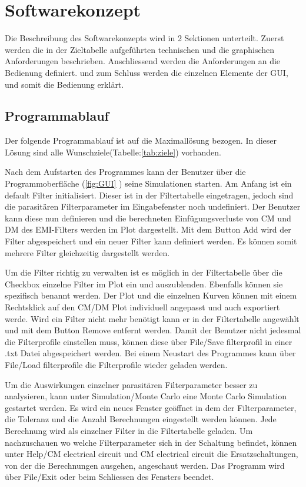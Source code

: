 \section{Softwarekonzept} \label{sec:softwarekonzept}

Die Beschreibung des Softwarekonzepts wird in 2 Sektionen unterteilt. Zuerst werden die in der Zieltabelle aufgeführten technischen und die graphischen Anforderungen beschrieben.  Anschliessend werden die Anforderungen an die Bedienung definiert. und zum Schluss werden die einzelnen Elemente der GUI, und somit die Bedienung erklärt.

\subsection{Programmablauf} \label{subsec:programmablauf}

Der folgende Programmablauf ist auf die Maximallösung bezogen. In dieser Lösung sind alle Wunschziele(Tabelle:\ref{tab:ziele}) vorhanden.

Nach dem Aufstarten des Programmes kann der Benutzer über die Programmoberfläche (\ref{fig:GUI} ) seine Simulationen starten.
Am Anfang ist ein default Filter initialisiert. Dieser ist in der Filtertabelle eingetragen, jedoch sind die parasitären Filterparameter im Eingabefenster noch undefiniert. Der Benutzer kann diese nun definieren und die berechneten Einfügungsverluste von CM und DM des EMI-Filters werden im Plot dargestellt. Mit dem Button Add wird der Filter abgespeichert und ein neuer Filter kann definiert werden. Es können somit mehrere Filter gleichzeitig dargestellt werden. 

Um die Filter richtig zu verwalten ist es möglich in der Filtertabelle über die Checkbox einzelne Filter im Plot ein und auszublenden. Ebenfalls können sie spezifisch benannt werden. Der Plot und die einzelnen Kurven können mit einem Rechtsklick auf den CM/DM Plot individuell angepasst und auch exportiert werde. Wird ein Filter nicht mehr benötigt kann er in der Filtertabelle angewählt und mit dem Button Remove entfernt werden. Damit der Benutzer nicht jedesmal die Filterprofile einstellen muss, können diese über File/Save filterprofil in einer .txt Datei abgespeichert werden. Bei einem Neustart des Programmes kann über File/Load filterprofile die Filterprofile wieder geladen werden. 

Um die Auswirkungen einzelner parasitären Filterparameter besser zu analysieren, kann unter Simulation/Monte Carlo eine Monte Carlo Simulation gestartet werden. Es wird ein neues Fenster geöffnet in dem der Filterparameter, die Toleranz und die Anzahl Berechnungen eingestellt werden können. Jede Berechnung wird als einzelner Filter in die Filtertabelle geladen. Um nachzuschauen wo welche Filterparameter sich in der Schaltung befindet, können unter Help/CM electrical circuit und CM electrical circuit die Ersatzschaltungen, von der die Berechnungen ausgehen, angeschaut werden. Das Programm wird über File/Exit oder beim Schliessen des Fensters beendet.

